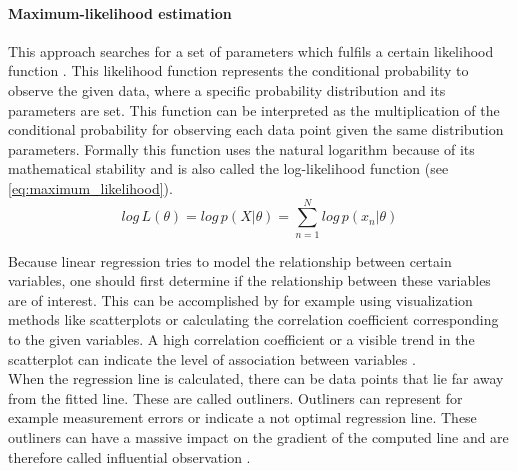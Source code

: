 \documentclass[
	english,
	ruledheaders=section,%
	class=report,%
	thesis={type=master},%
	accentcolor=8c,%
	custommargins=true,%
	marginpar=false,%
	parskip=half-,%
	fontsize=11pt,%
]{tudapub}
\begin{document}
\paragraph{Maximum-likelihood estimation}
This approach searches for a set of parameters which fulfils a certain likelihood function \cite{slides_on_linear_regression}. This likelihood function represents the conditional probability to observe the given data, where a specific probability distribution and its parameters are set. This function can be interpreted as the multiplication of the conditional probability for observing each data point given the same distribution parameters. Formally this function uses the natural logarithm because of its mathematical stability and is also called the log-likelihood function (see \ref{eq:maximum_likelihood}). 
\begin{equation}
log\,L(\theta) = log\,p(X|\theta) = \sum_{n=1}^{N} log\,p(x_n|\theta)
\label{eq:maximum_likelihood}
\end{equation}

Because linear regression tries to model the relationship between certain variables, one should first determine if the relationship between these variables are of interest. This can be accomplished by for example using visualization methods like scatterplots or calculating the correlation coefficient corresponding to the given variables. A high correlation coefficient or a visible trend in the scatterplot can indicate the level of association between variables \cite{noauthor_linear_nodate, montgomery2021introduction}.\\

When the regression line is calculated, there can be data points that lie far away from the fitted line. These are called outliners. Outliners can represent for example measurement errors or indicate a not optimal regression line. These outliners can have a massive impact on the gradient of the computed line and are therefore called influential observation \cite{noauthor_linear_nodate, montgomery2021introduction}.  
\end{document}

